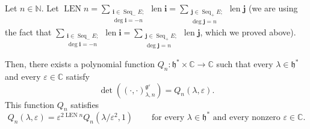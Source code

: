 \documentclass[etingof-lie.tex]{subfiles}
\begin{document}
\begin{corollary}
\label{cor.invformnondeg.polynomiality}Let $n\in\mathbb{N}$. Let
$\operatorname*{LEN}n=\sum\limits_{\substack{\mathbf{i}\in\operatorname*{Seq}%
\nolimits_{-}E;\\\deg\mathbf{i}=-n}}\operatorname*{len}\mathbf{i=}%
\sum\limits_{\substack{\mathbf{j}\in\operatorname*{Seq}\nolimits_{+}%
E;\\\deg\mathbf{j}=n}}\operatorname*{len}\mathbf{j}$ (we are using the fact
that $\sum\limits_{\substack{\mathbf{i}\in\operatorname*{Seq}\nolimits_{-}%
E;\\\deg\mathbf{i}=-n}}\operatorname*{len}\mathbf{i=}\sum
\limits_{\substack{\mathbf{j}\in\operatorname*{Seq}\nolimits_{+}%
E;\\\deg\mathbf{j}=n}}\operatorname*{len}\mathbf{j}$, which we proved above).

Then, there exists a polynomial function $Q_{n}:\mathfrak{h}^{\ast}%
\times\mathbb{C}\rightarrow\mathbb{C}$ such that every $\lambda\in
\mathfrak{h}^{\ast}$ and every $\varepsilon\in\mathbb{C}$ satisfy%
\begin{equation}
\det\left(  \left(  \cdot,\cdot\right)  _{\lambda,n}^{\mathfrak{g}%
^{\varepsilon}}\right)  =Q_{n}\left(  \lambda,\varepsilon\right)  .
\label{cor.invformnondeg.polynomiality.1}%
\end{equation}
This function $Q_{n}$ satisfies%
\[
Q_{n}\left(  \lambda,\varepsilon\right)  =\varepsilon^{2\operatorname*{LEN}%
n}Q_{n}\left(  \lambda/\varepsilon^{2},1\right)  \ \ \ \ \ \ \ \ \ \ \text{for
every }\lambda\in\mathfrak{h}^{\ast}\text{ and every nonzero }\varepsilon
\in\mathbb{C}.
\]

\end{corollary}
\end{document}
